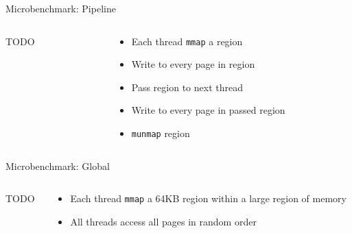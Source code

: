 \documentclass[aspectratio=169]{beamer}
\newcommand{\bi}{\begin{itemize}}
\newcommand{\ei}{\end{itemize}}
\begin{document}
\begin{frame}{Microbenchmark: Pipeline}
  \begin{columns}[T]
    \begin{column}{0.2\textwidth}
      TODO
    \end{column}
    \begin{column}{0.8\textwidth}
      \bi
    \item Each thread \texttt{mmap} a region
    \item Write to every page in region
    \item Pass region to next thread
    \item Write to every page in passed region
    \item \texttt{munmap} region
      \ei
    \end{column}
  \end{columns}
\end{frame}

\begin{frame}{Microbenchmark: Global}
  \begin{columns}[T]
    \begin{column}{0.2\textwidth}
      TODO
    \end{column}
    \begin{column}{0.8\textwidth}
      \bi
    \item Each thread \texttt{mmap} a 64KB region within a large region of memory
    \item All threads access all pages in random order
      \ei
    \end{column}
  \end{columns}
\end{frame}
\end{document}
